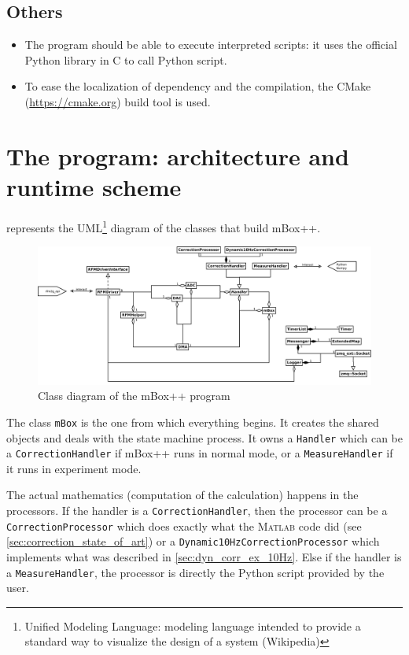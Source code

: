 \subsection{Others}
\begin{itemize}
\item The program should be able to execute interpreted scripts: it uses the official Python library in C to call Python script. 
\item To ease the localization of dependency and the compilation, the CMake (\url{https://cmake.org}) build tool is used.
\end{itemize}

\section{The program: architecture and runtime scheme}

 represents the UML\footnote{Unified Modeling Language: modeling language intended to provide a standard way to visualize the design of a system (Wikipedia)} diagram of the classes that build mBox++.

\begin{figure}
    \includegraphics[width=\linewidth]{img/mBox_classDiagram}
    \caption{\label{fig:mbox_class_diag}Class diagram of the mBox++ program}
\end{figure}

The class \texttt{mBox} is the one from which everything begins. It creates the shared objects and deals with the state machine process. It owns a \texttt{Handler} which can be a \texttt{CorrectionHandler} if mBox++ runs in normal mode, or a \texttt{MeasureHandler} if it runs in experiment mode.

The actual mathematics (computation of the calculation) happens in the processors. If the handler is a \texttt{CorrectionHandler}, then the processor can be a \texttt{CorrectionProcessor} which does exactly what the \textsc{Matlab} code did (see \cref{sec:correction_state_of_art}) or a \texttt{Dynamic10HzCorrectionProcessor} which implements what was described in \cref{sec:dyn_corr_ex_10Hz}. Else if the handler is a \texttt{MeasureHandler}, the processor is directly the Python script provided by the user.

